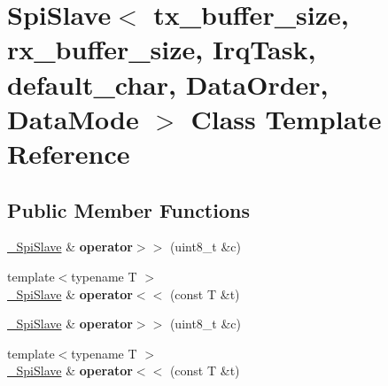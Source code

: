\hypertarget{classSpiSlave}{}\section{Spi\+Slave$<$ tx\+\_\+buffer\+\_\+size, rx\+\_\+buffer\+\_\+size, Irq\+Task, default\+\_\+char, Data\+Order, Data\+Mode $>$ Class Template Reference}
\label{classSpiSlave}
\subsection*{Public Member Functions}
\begin{DoxyCompactItemize}
\item 
\hyperlink{classSpiSlave}{\+\_\+\+Spi\+Slave} \& {\bfseries operator$>$$>$} (uint8\+\_\+t \&c)\hypertarget{classSpiSlave_aa1cecfc282b2950f542269d48de0f30c}{}\label{classSpiSlave_aa1cecfc282b2950f542269d48de0f30c}

\item 
{\footnotesize template$<$typename T $>$ }\\\hyperlink{classSpiSlave}{\+\_\+\+Spi\+Slave} \& {\bfseries operator$<$$<$} (const T \&t)\hypertarget{classSpiSlave_abcaf373a5ffd770c2c2b7f4bbf72beb3}{}\label{classSpiSlave_abcaf373a5ffd770c2c2b7f4bbf72beb3}

\item 
\hyperlink{classSpiSlave}{\+\_\+\+Spi\+Slave} \& {\bfseries operator$>$$>$} (uint8\+\_\+t \&c)\hypertarget{classSpiSlave_aa1cecfc282b2950f542269d48de0f30c}{}\label{classSpiSlave_aa1cecfc282b2950f542269d48de0f30c}

\item 
{\footnotesize template$<$typename T $>$ }\\\hyperlink{classSpiSlave}{\+\_\+\+Spi\+Slave} \& {\bfseries operator$<$$<$} (const T \&t)\hypertarget{classSpiSlave_abcaf373a5ffd770c2c2b7f4bbf72beb3}{}\label{classSpiSlave_abcaf373a5ffd770c2c2b7f4bbf72beb3}

\end{DoxyCompactItemize}
